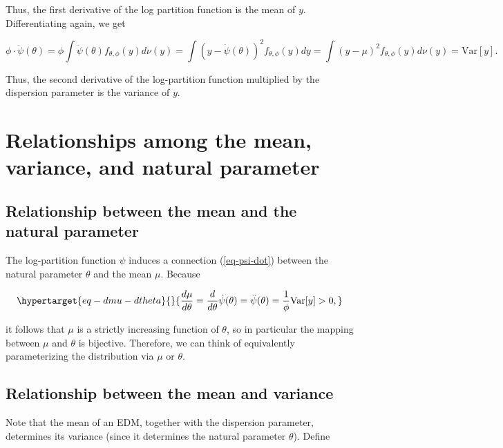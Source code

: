 \documentclass[
  11pt,
  letterpaper,
  oneside]{book}
\theoremstyle{definition}
\theoremstyle{plain}
\theoremstyle{plain}
\theoremstyle{plain}
\theoremstyle{remark}
\begin{document}
Thus, the first derivative of the log partition function is the mean of
\(y\). Differentiating again, we get

\[
\phi \cdot \ddot \psi(\theta) = \phi \int \ddot \psi(\theta) f_{\theta, \phi}(y) d\nu(y) = \int (y - \dot \psi(\theta))^2 f_{\theta, \phi}(y) dy = \int (y - \mu)^2f_{\theta, \phi}(y) d\nu(y) = \text{Var}[y].
\]

Thus, the second derivative of the log-partition function multiplied by
the dispersion parameter is the variance of \(y\).

\hypertarget{relationships-among-the-mean-variance-and-natural-parameter}{%
\section{Relationships among the mean, variance, and natural
parameter}\label{relationships-among-the-mean-variance-and-natural-parameter}}

\hypertarget{relationship-between-the-mean-and-the-natural-parameter}{%
\subsection{Relationship between the mean and the natural
parameter}\label{relationship-between-the-mean-and-the-natural-parameter}}

The log-partition function \(\psi\) induces a connection
(\ref{eq-psi-dot}) between the natural parameter \(\theta\) and the mean
\(\mu\). Because

\begin{equation}\protect\hypertarget{eq-dmu-dtheta}{}{
\frac{d\mu}{d\theta} = \frac{d}{d\theta}\dot \psi(\theta) = \ddot \psi(\theta) = \frac{1}{\phi}\text{Var}[y] > 0,
}\label{eq-dmu-dtheta}\end{equation}

it follows that \(\mu\) is a strictly increasing function of \(\theta\),
so in particular the mapping between \(\mu\) and \(\theta\) is
bijective. Therefore, we can think of equivalently parameterizing the
distribution via \(\mu\) or \(\theta\).

\hypertarget{relationship-between-the-mean-and-variance}{%
\subsection{Relationship between the mean and
variance}\label{relationship-between-the-mean-and-variance}}

Note that the mean of an EDM, together with the dispersion parameter,
determines its variance (since it determines the natural parameter
\(\theta\)). Define
\end{document}
